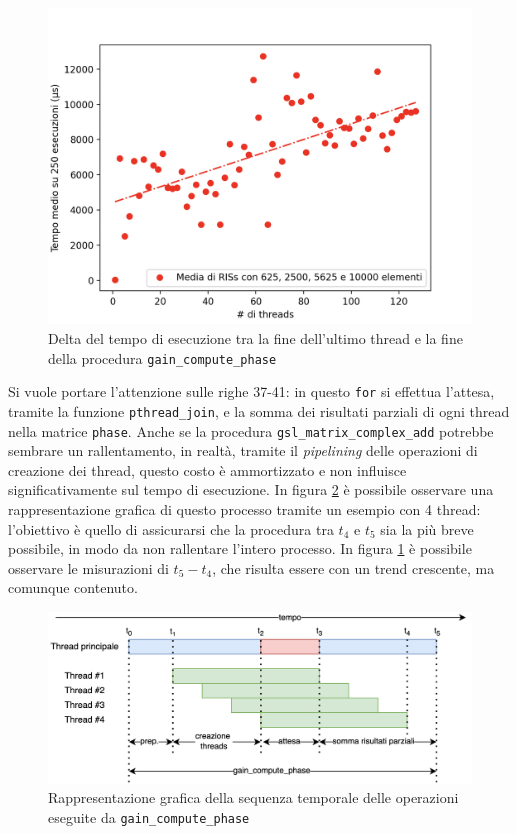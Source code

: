 \begin{figure}
  \centering
  \includegraphics[width=.6\textwidth]{images/results/gain-serial-time.png}
  \caption{Delta del tempo di esecuzione tra la fine dell'ultimo thread e la
  fine della procedura \texttt{gain\_compute\_phase}}
  \label{fig:serial-time}
\end{figure}

Si vuole portare l'attenzione sulle righe 37-41: in questo \texttt{for} si effettua
l'attesa, tramite la funzione \texttt{pthread\_join}, e la somma dei risultati
parziali di ogni thread nella matrice \texttt{phase}. Anche se la procedura
\texttt{gsl\_matrix\_complex\_add} potrebbe sembrare un rallentamento, in realtà,
tramite il \textit{pipelining} delle operazioni di creazione dei thread, questo costo
è ammortizzato e non influisce significativamente sul tempo di esecuzione. In
figura \ref{fig:gain-compute-phase-pipeline} è possibile osservare una
rappresentazione grafica di questo processo tramite un esempio con 4 thread: l'obiettivo
è quello di assicurarsi che la procedura tra $t_{4}$ e $t_{5}$ sia la più breve possibile,
in modo da non rallentare l'intero processo. In figura \ref{fig:serial-time} è possibile
osservare le misurazioni di $t_{5}- t_{4}$, che risulta essere con un trend
crescente, ma comunque contenuto.

\begin{figure}
  \centering
  \includegraphics[width=\textwidth]{
    images/examples/gain_compute_phase-pipeline.png
  }
  \caption{Rappresentazione grafica della sequenza temporale delle operazioni
  eseguite da \texttt{gain\_compute\_phase}}
  \label{fig:gain-compute-phase-pipeline}
\end{figure}

